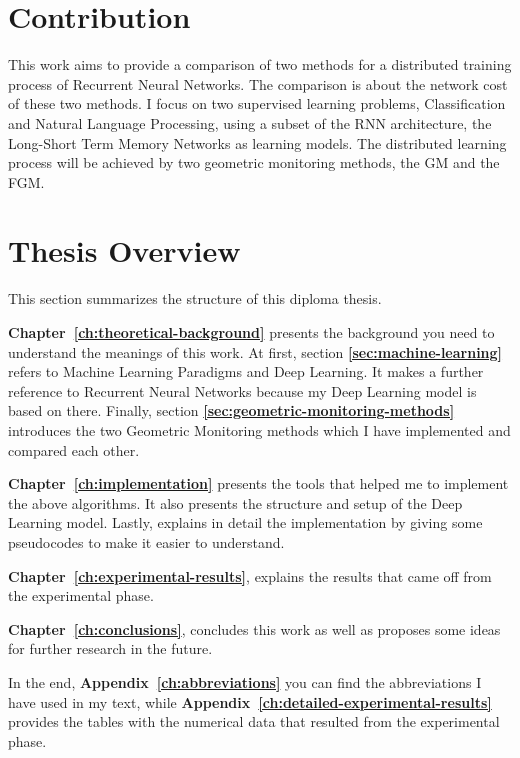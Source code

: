 \section{Contribution}\label{sec:contribution}

This work aims to provide a comparison of two methods for a distributed training process of Recurrent Neural Networks.
The comparison is about the network cost of these two methods.
I focus on two supervised learning problems, Classification and Natural Language Processing, using a subset of the RNN architecture, the Long-Short Term Memory Networks as learning models.
The distributed learning process will be achieved by two geometric monitoring methods, the GM and the FGM\@.

\section{Thesis Overview}\label{sec:thesis-overview}

This section summarizes the structure of this diploma thesis.

\textbf{Chapter~\ref{ch:theoretical-background}} presents the background you need to understand the meanings of this work.
At first, section \textbf{\ref{sec:machine-learning}} refers to Machine Learning Paradigms and Deep Learning.
It makes a further reference to Recurrent Neural Networks because my Deep Learning model is based on there.
Finally, section \textbf{\ref{sec:geometric-monitoring-methods}} introduces the two Geometric Monitoring methods which I have implemented and compared each other.

\textbf{Chapter~\ref{ch:implementation}} presents the tools that helped me to implement the above algorithms.
It also presents the structure and setup of the Deep Learning model.
Lastly, explains in detail the implementation by giving some pseudocodes to make it easier to understand.

\textbf{Chapter~\ref{ch:experimental-results}}, explains the results that came off from the experimental phase.

\textbf{Chapter~\ref{ch:conclusions}}, concludes this work as well as proposes some ideas for further research in the future.

In the end, \textbf{Appendix~\ref{ch:abbreviations}} you can find the abbreviations I have used in my text,
while \textbf{Appendix~\ref{ch:detailed-experimental-results}} provides the tables with the numerical data that resulted from the experimental phase.